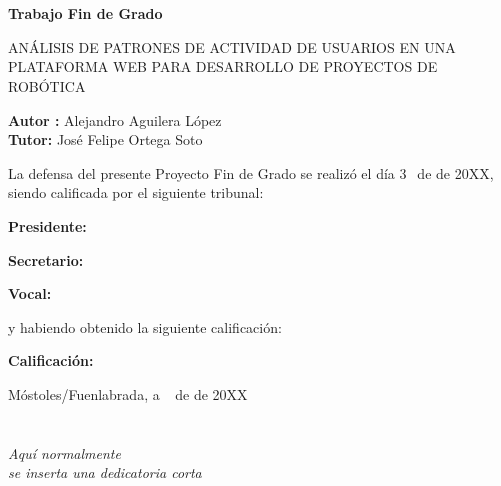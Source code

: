 \documentclass[a4paper, 12pt]{book}
\begin{document}
\newpage
\mbox{}
\thispagestyle{empty} %


\clearpage
{}
\chapter*{}

\vspace{-4cm}
\begin{center}
\LARGE
\textbf{Trabajo Fin de Grado}

\vspace{1cm}
\large
ANÁLISIS DE PATRONES DE ACTIVIDAD DE USUARIOS EN UNA PLATAFORMA WEB 
PARA DESARROLLO DE PROYECTOS DE ROBÓTICA

\vspace{1cm}
\large
\textbf{Autor :} Alejandro Aguilera López  \\
\textbf{Tutor:} José Felipe Ortega Soto

\end{center}

\vspace{1cm}
La defensa del presente Proyecto Fin de Grado se realizó el día 3\qquad$\;\,$ de
\qquad\qquad\qquad\qquad \newline de 20XX, siendo calificada por el siguiente tribunal:


\vspace{0.5cm}
\textbf{Presidente:}

\vspace{0.8cm}
\textbf{Secretario:}

\vspace{0.8cm}
\textbf{Vocal:}


\vspace{0.8cm}
y habiendo obtenido la siguiente calificación:

\vspace{0.8cm}
\textbf{Calificación:}


\vspace{0.8cm}
\begin{flushright}
Móstoles/Fuenlabrada, a \qquad$\;\,$ de \qquad\qquad\qquad\qquad de 20XX
\end{flushright}


\chapter*{}
\begin{flushright}
\textit{Aquí normalmente \\
se inserta una dedicatoria corta \\}
\end{flushright}
\end{document}
